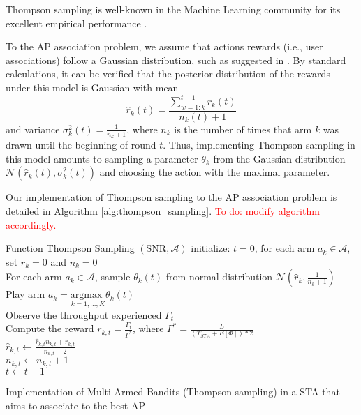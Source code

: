 \documentclass{article}
\begin{document}
			Thompson sampling is well-known in the Machine Learning community for its excellent empirical performance \cite{CL11}. 
			 
			To the AP association problem, we assume that actions rewards (i.e., user associations) follow a Gaussian distribution, such as suggested in \cite{agrawal2013further}. By standard calculations, it can be verified that the posterior distribution of the rewards under this model is Gaussian with mean 
			\begin{equation}
				\hat{r}_k(t) = \frac{\sum_{w=1:k}^{t-1} r_k(t) }{n_k(t) + 1}
				\nonumber
			\end{equation}
			and variance $\sigma_k^2(t) = \frac{1}{n_k + 1}$, where $n_k$ is the number of times that arm $k$ was drawn until the beginning of round $t$. Thus, implementing Thompson sampling in this model amounts to sampling a parameter $\theta_k$ from the Gaussian distribution $\mathcal{N}\left(\hat{r}_k(t),\sigma_k^2(t)\right)$ and choosing the action with the maximal parameter.   
			
			Our implementation of Thompson sampling to the AP association problem is detailed in Algorithm \ref{alg:thompson_sampling}.
			\textcolor{red}{To do: modify algorithm accordingly.}	
			\begin{algorithm}[h!]
				Function Thompson Sampling $(\text{SNR},\mathcal{A})$\;
				initialize: $t=0$,  for each arm $a_k \in \mathcal{A}$, set $\hat{r}_{k} = 0$ and $n_k = 0$ \\
				{
					For each arm $a_k \in \mathcal{A}$, sample $\theta_k(t)$ from normal distribution $\mathcal{N}(\hat{r}_{k}, \frac{1}{n_k + 1})$ \\
					Play arm $a_{k} = \underset{k=1,...,K}{\text{argmax }} \theta_k(t) $ \\
					Observe the throughput experienced $\Gamma_t$\\			
					Compute the reward $r_{k,t} = \frac{\Gamma_t}{\Gamma^*}$, where $\Gamma^* = \frac{L}{(T_{STA}+E[\Phi])*2}$ \\
					$ \hat{r}_{k,t} \leftarrow \frac{\hat{r}_{k,t}  n_{k,t} + r_{k,t}}{n_{k,t} + 2}$\\
					$n_{k,t} \leftarrow n_{k,t} + 1$\\
					$t \leftarrow t + 1$
				}
				\caption{Implementation of Multi-Armed Bandits (Thompson sampling) in a STA that aims to associate to the best AP}
				\label{alg:thompson_sampling}
			\end{algorithm}	
			
\end{document}
